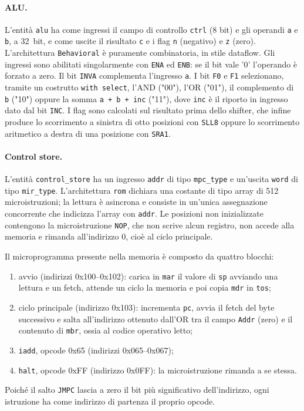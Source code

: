 \paragraph{ALU.}
L'entità \texttt{alu} ha come ingressi il campo di controllo \texttt{ctrl} (8 bit) e gli operandi \texttt{a} e \texttt{b}, a \SI{32}{bit}, e come uscite il risultato \texttt{c} e i flag \texttt{n} (negativo) e \texttt{z} (zero). L'architettura \texttt{Behavioral} è puramente combinatoria, in stile dataflow. Gli ingressi sono abilitati singolarmente con \texttt{ENA} ed \texttt{ENB}: se il bit vale '0' l'operando è forzato a zero. Il bit \texttt{INVA} complementa l'ingresso \texttt{a}. I bit \texttt{F0} e \texttt{F1} selezionano, tramite un costrutto \texttt{with select}, l'AND ("00"), l'OR ("01"), il complemento di \texttt{b} ("10") oppure la somma \texttt{a + b + inc} ("11"), dove \texttt{inc} è il riporto in ingresso dato dal bit \texttt{INC}. I flag sono calcolati sul risultato prima dello shifter, che infine produce lo scorrimento a sinistra di otto posizioni con \texttt{SLL8} oppure lo scorrimento aritmetico a destra di una posizione con \texttt{SRA1}.


\paragraph{Control store.}
L'entità \texttt{control\_store} ha un ingresso \texttt{addr} di tipo \texttt{mpc\_type} e un'uscita \texttt{word} di tipo \texttt{mir\_type}. L'architettura \texttt{rom} dichiara una costante di tipo array di 512 microistruzioni; la lettura è asincrona e consiste in un'unica assegnazione concorrente che indicizza l'array con \texttt{addr}. Le posizioni non inizializzate contengono la microistruzione \texttt{NOP}, che non scrive alcun registro, non accede alla memoria e rimanda all'indirizzo 0, cioè al ciclo principale.

Il microprogramma presente nella memoria è composto da quattro blocchi:
\begin{enumerate}
  \item avvio (indirizzi 0x100--0x102): carica in \texttt{mar} il valore di \texttt{sp} avviando una lettura e un fetch, attende un ciclo la memoria e poi copia \texttt{mdr} in \texttt{tos};
  \item ciclo principale (indirizzo 0x103): incrementa \texttt{pc}, avvia il fetch del byte successivo e salta all'indirizzo ottenuto dall'OR tra il campo \texttt{Addr} (zero) e il contenuto di \texttt{mbr}, ossia al codice operativo letto;
  \item \texttt{iadd}, opcode 0x65 (indirizzi 0x065--0x067);
  \item \texttt{halt}, opcode 0xFF (indirizzo 0x0FF): la microistruzione rimanda a se stessa.
\end{enumerate}
Poiché il salto \texttt{JMPC} lascia a zero il bit più significativo dell'indirizzo, ogni istruzione ha come indirizzo di partenza il proprio opcode.

